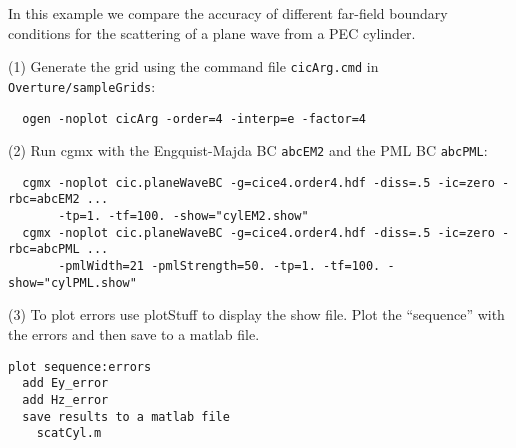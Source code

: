 \documentclass{article}
\begin{document}
In this example we compare the accuracy of different far-field boundary conditions for
the scattering of a plane wave from a PEC cylinder.


\noindent (1) Generate the grid using the command file {\tt cicArg.cmd} in {\tt Overture/sampleGrids}:
\begin{verbatim}
  ogen -noplot cicArg -order=4 -interp=e -factor=4
\end{verbatim}

\noindent (2) Run cgmx with the Engquist-Majda BC {\tt abcEM2} and the PML BC {\tt abcPML}: 
\begin{verbatim}
  cgmx -noplot cic.planeWaveBC -g=cice4.order4.hdf -diss=.5 -ic=zero -rbc=abcEM2 ...
       -tp=1. -tf=100. -show="cylEM2.show"
  cgmx -noplot cic.planeWaveBC -g=cice4.order4.hdf -diss=.5 -ic=zero -rbc=abcPML ...
       -pmlWidth=21 -pmlStrength=50. -tp=1. -tf=100. -show="cylPML.show"
\end{verbatim}

\noindent (3) To plot errors use plotStuff to display the show file. Plot the ``sequence'' with the errors
and then save to a matlab file. 
\begin{verbatim}
plot sequence:errors
  add Ey_error
  add Hz_error
  save results to a matlab file
    scatCyl.m 
\end{verbatim}
\end{document}

